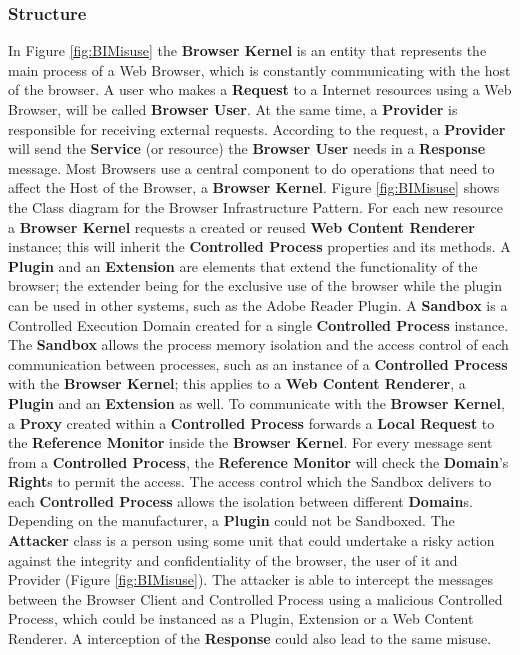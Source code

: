 \documentclass{sig-alternate-05-2015}
\begin{document}
\subsubsection*{Structure}
In Figure \ref{fig:BIMisuse} the \textbf{Browser Kernel} is an entity that represents the main process of a Web Browser, which is constantly communicating with the host of the browser. A user who makes a \textbf{Request} to a Internet resources using a Web Browser, will be called \textbf{Browser User}. At the same time, a \textbf{Provider} is responsible for receiving external requests. According to the request, a \textbf{Provider} will send the \textbf{Service} (or resource) the \textbf{Browser User} needs in a \textbf{Response} message. Most Browsers use a central component to do operations that need to affect the Host of the Browser, a \textbf{Browser Kernel}. Figure \ref{fig:BIMisuse} shows the Class diagram for the Browser Infrastructure Pattern. For each new resource a \textbf{Browser Kernel} requests a created or reused \textbf{Web Content Renderer} instance; this will inherit the \textbf{Controlled Process} properties and its methods. A \textbf{Plugin} and an \textbf{Extension} are elements that extend the functionality of the browser; the extender being for the exclusive use of the browser while the plugin can be used in other systems, such as the Adobe Reader Plugin. A \textbf{Sandbox} is a Controlled Execution Domain \cite{fernandez2013security} created for a single \textbf{Controlled Process} instance. The \textbf{Sandbox} allows the process memory isolation and the access control of each communication between processes, such as an instance of a \textbf{Controlled Process} with the \textbf{Browser Kernel}; this applies to a \textbf{Web Content Renderer}, a \textbf{Plugin} and an \textbf{Extension} as well. To communicate with the \textbf{Browser Kernel}, a \textbf{Proxy} created within a \textbf{Controlled Process} forwards a \textbf{Local Request} to the \textbf{Reference Monitor} inside the \textbf{Browser Kernel}. For every message sent from a \textbf{Controlled Process}, the \textbf{Reference Monitor} will check the \textbf{Domain}'s \textbf{Right}s to permit the access. The access control which the Sandbox delivers to each \textbf{Controlled Process} allows the isolation between different \textbf{Domain}s. Depending on the manufacturer, a \textbf{Plugin} could not be Sandboxed. The \textbf{Attacker} class is a person using some unit that could undertake a risky action against the integrity and confidentiality of the browser, the user of it and Provider (Figure \ref{fig:BIMisuse}). The attacker is able to intercept the messages between the Browser Client and Controlled Process using a malicious Controlled Process, which could be instanced as a Plugin, Extension or a Web Content Renderer. A interception of the \textbf{Response} could also lead to the same misuse.
\end{document}
